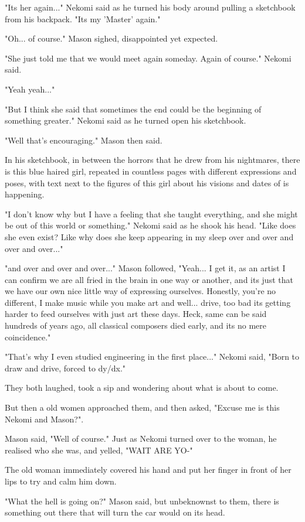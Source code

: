 "Its her again..." Nekomi said as he turned his body around pulling a sketchbook from his backpack. "Its my 'Master' again."

"Oh... of course." Mason sighed, disappointed yet expected. 

"She just told me that we would meet again someday. Again of course." Nekomi said. 

"Yeah yeah..."

"But I think she said that sometimes the end could be the beginning of something greater." Nekomi said as he turned open his sketchbook. 

"Well that's encouraging." Mason then said. 

In his sketchbook, in between the horrors that he drew from his nightmares, there is this blue haired girl, repeated in countless pages with different expressions and poses, with text next to the figures of this girl about his visions and dates of is happening. 

"I don't know why but I have a feeling that she taught everything, and she might be out of this world or something." Nekomi said as he shook his head. "Like does she even exist? Like why does she keep appearing in my sleep over and over and over and over..."

"and over and over and over..." Mason followed, "Yeah... I get it, as an artist I can confirm we are all fried in the brain in one way or another, and its just that we have our own nice little way of expressing ourselves. Honestly, you're no different, I make music while you make art and well... drive, too bad its getting harder to feed ourselves with just art these days. Heck, same can be said hundreds of years ago, all classical composers died early, and its no mere coincidence."

"That's why I even studied engineering in the first place..." Nekomi said, "Born to draw and drive, forced to dy/dx."

They both laughed, took a sip and wondering about what is about to come.

But then a old women approached them, and then asked, "Excuse me is this Nekomi and Mason?". 

Mason said, "Well of course." Just as Nekomi turned over to the woman, he realised who she was, and yelled, "WAIT ARE YO-"

The old woman immediately covered his hand and put her finger in front of her lips to try and calm him down. 

"What the hell is going on?" Mason said, but unbeknownst to them, there is something out there that will turn the car would on its head.
